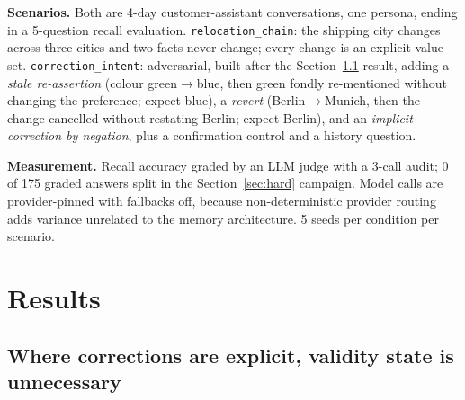 \documentclass{article}
\begin{document}
\textbf{Scenarios.} Both are 4-day customer-assistant conversations, one persona, ending in a 5-question recall evaluation. \texttt{relocation\_chain}: the shipping city changes across three cities and two facts never change; every change is an explicit value-set. \texttt{correction\_intent}: adversarial, built after the Section~\ref{sec:easy} result, adding a \emph{stale re-assertion} (colour green$\rightarrow$blue, then green fondly re-mentioned without changing the preference; expect blue), a \emph{revert} (Berlin$\rightarrow$Munich, then the change cancelled without restating Berlin; expect Berlin), and an \emph{implicit correction by negation}, plus a confirmation control and a history question.

\textbf{Measurement.} Recall accuracy graded by an LLM judge with a 3-call audit; 0 of 175 graded answers split in the Section~\ref{sec:hard} campaign. Model calls are provider-pinned with fallbacks off, because non-deterministic provider routing adds variance unrelated to the memory architecture. 5 seeds per condition per scenario.

\section{Results}

\subsection{Where corrections are explicit, validity state is unnecessary}
\label{sec:easy}
\end{document}
